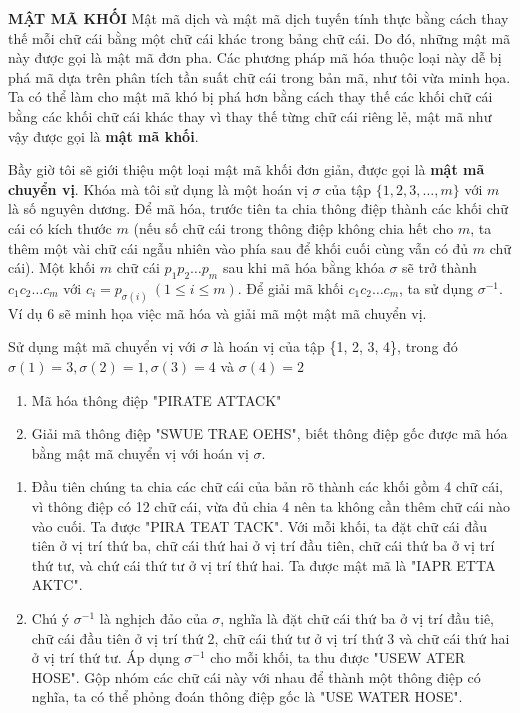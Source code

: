 \noindent \textcolor{Mycolor}{\textbf{MẬT MÃ KHỐI}} Mật mã dịch và mật mã dịch tuyến tính thực bằng cách thay thế mỗi chữ cái bằng một chữ cái khác trong bảng chữ cái. Do đó, những mật mã này được gọi là mật mã đơn pha. Các phương pháp mã hóa thuộc loại này dễ bị phá mã dựa trên phân tích tần suất chữ cái trong bản mã, như tôi vừa minh họa. Ta có thể làm cho mật mã khó bị phá hơn bằng cách thay thế các khối chữ cái bằng các khối chữ cái khác thay vì thay thế từng chữ cái riêng lẻ, mật mã như vậy được gọi là \textbf{mật mã khối}.

Bầy giờ tôi sẽ giới thiệu một loại mật mã khối đơn giản, được gọi là \textbf{mật mã chuyển vị}. Khóa mà tôi sử dụng là một hoán vị $\sigma$ của tập $\{1,2,3,\ldots,m\}$ với $m$ là số nguyên dương. Để mã hóa, trước tiên ta chia thông điệp thành các khối chữ cái có kích thước $m$ (nếu số chữ cái trong thông điệp không chia hết cho $m$, ta thêm một vài chữ cái ngẫu nhiên vào phía sau để khối cuối cùng vẫn có đủ $m$ chữ cái). Một khối $m$ chữ cái $p_1p_2\ldots p_m$ sau khi mã hóa bằng khóa $\sigma$ sẽ trở thành $c_1c_2\ldots c_m$ với $c_i = p_{\sigma(i)}\ ( 1\leq i \leq m)$. Để giải mã khối $c_1c_2\ldots c_m$, ta sử dụng $\sigma^{-1}$. Ví dụ 6 sẽ minh họa việc mã hóa và giải mã một mật mã chuyển vị.

\begin{example}
    Sử dụng mật mã chuyển vị với $\sigma$ là hoán vị của tập \{1, 2, 3, 4\}, trong đó $\sigma (1) = 3, \sigma (2) = 1, \sigma (3) = 4$ và $\sigma (4) = 2$
    \begin{enumerate}[label=\alph*)]
        \item Mã hóa thông điệp "PIRATE ATTACK"
        \item Giải mã thông điệp "SWUE TRAE OEHS", biết thông điệp gốc được mã hóa bằng mật mã chuyển vị với hoán vị $\sigma$.
    \end{enumerate}
\end{example}
\begin{solution}
    \begin{enumerate}[label=\alph*)]
        \item Đầu tiên chúng ta chia các chữ cái của bản rõ thành các khối gồm 4 chữ cái, vì thông điệp có 12 chữ cái, vừa đủ chia 4 nên ta không cần thêm chữ cái nào vào cuối.
              Ta được "PIRA TEAT TACK". Với mỗi khối, ta đặt chữ cái đầu tiên ở vị trí thứ ba, chữ cái thứ hai ở vị trí đầu tiên, chữ cái thứ ba ở vị trí thứ tư, và chứ cái thứ tư ở vị trí thứ hai.
              Ta được mật mã là "IAPR ETTA AKTC".

        \item Chú ý $\sigma^{-1}$ là nghịch đảo của $\sigma$, nghĩa là đặt chữ cái thứ ba ở vị trí đầu tiê, chữ cái đầu tiên ở vị trí thứ 2, chữ cái thứ tư ở vị trí thứ 3 và chữ cái thứ hai ở vị trí thứ tư.
              Áp dụng $\sigma^{-1}$ cho mỗi khối, ta thu được "USEW ATER HOSE". Gộp nhóm các chữ cái này với nhau để thành một thông điệp có nghĩa, ta có thể phỏng đoán thông điệp gốc là "USE WATER HOSE".
    \end{enumerate}
\end{solution}

